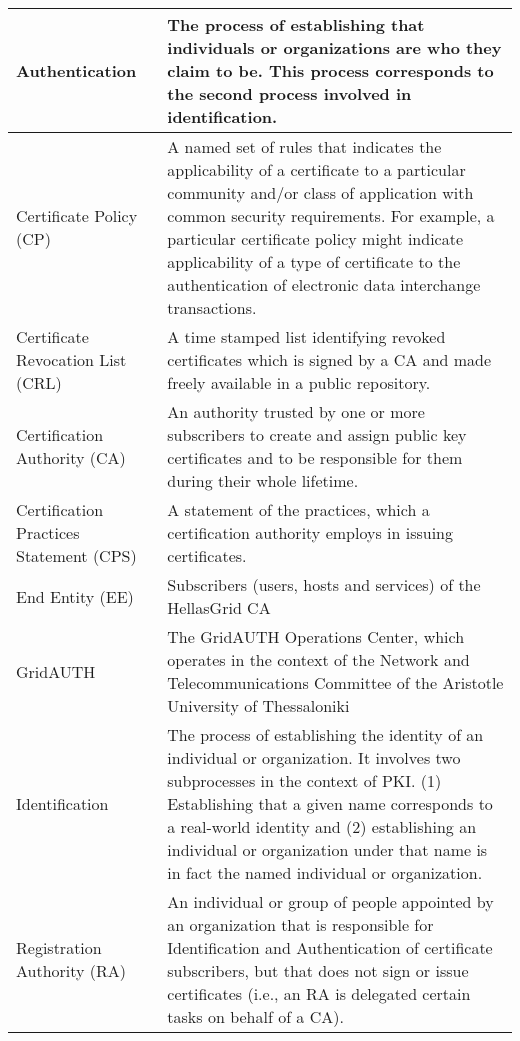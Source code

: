 \documentclass[11pt,a4paper,titlepage]{book}
\begin{document}
\begin{tabular}{|p{}|p{}|}
	
\hline
Authentication & 
The process of establishing that individuals or organizations are who they claim to be. This process corresponds to the second process involved in identification. \\
\hline
Certificate Policy (CP) &
A named set of rules that indicates the applicability of a certificate to a particular community and/or class of application with common security requirements. For example, a particular certificate policy might indicate applicability of a type of certificate to the authentication of electronic data interchange transactions. \\
\hline
Certificate Revocation List (CRL) &
A time stamped list identifying revoked certificates which is signed by a CA and made freely available in a public repository. \\
\hline
Certification Authority (CA) &
An authority trusted by one or more subscribers to create and assign public key certificates and to be responsible for them during their whole lifetime. \\
\hline
Certification Practices Statement (CPS) &
A statement of the practices, which a certification authority employs in issuing certificates. \\
\hline
End Entity (EE) & 
Subscribers (users, hosts and services) of the HellasGrid CA \\
\hline
GridAUTH & 
The GridAUTH Operations Center, which operates in the context of the Network and Telecommunications Committee of the Aristotle University of Thessaloniki \\
\hline
Identification & 
The process of establishing the identity of an individual or organization. It involves two subprocesses in the context of PKI. (1) Establishing that a given name corresponds to a real-world identity and (2) establishing an individual or organization under that name is in fact the named individual or organization. \\
\hline
Registration Authority (RA) & 
An individual or group of people appointed by an organization that is responsible for Identification and Authentication of certificate subscribers, but that does not sign or issue certificates (i.e., an RA is delegated certain tasks on behalf of a CA).\\

\end{tabular}
\end{document}

